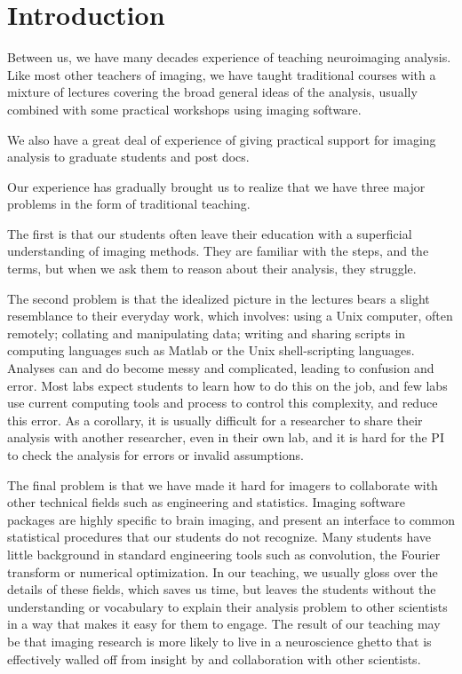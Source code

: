 \section{Introduction}

Between us, we have many decades experience of teaching neuroimaging analysis.
Like most other teachers of imaging, we have taught traditional courses with a
mixture of lectures covering the broad general ideas of the analysis, usually
combined with some practical workshops using imaging software.

We also have a great deal of experience of giving practical support for
imaging analysis to graduate students and post docs.

Our experience has gradually brought us to realize that we have three major
problems in the form of traditional teaching.

The first is that our students often leave their education with a superficial
understanding of imaging methods.  They are familiar with the steps, and the
terms, but when we ask them to reason about their analysis, they struggle.

The second problem is that the idealized picture in the lectures bears a
slight resemblance to their everyday work, which involves: using a Unix
computer, often remotely; collating and manipulating data; writing and sharing
scripts in computing languages such as Matlab or the Unix shell-scripting
languages.  Analyses can and do become messy and complicated, leading to
confusion and error.  Most labs expect students to learn how to do this on the
job, and few labs use current computing tools and process to control this
complexity, and reduce this error.  As a corollary, it is usually
difficult for a researcher to share their analysis with another
researcher, even in their own lab, and it is hard for the PI to check the
analysis for errors or invalid assumptions.

The final problem is that we have made it hard for imagers to collaborate with
other technical fields such as engineering and statistics.  Imaging software
packages are highly specific to brain imaging, and present an interface to
common statistical procedures that our students do not recognize.  Many
students have little background in standard engineering tools such as
convolution, the Fourier transform or numerical optimization.  In our
teaching, we usually gloss over the details of these fields, which saves us
time, but leaves the students without the understanding or vocabulary to
explain their analysis problem to other scientists in a way that makes it easy
for them to engage.  The result of our teaching may be that imaging research
is more likely to live in a neuroscience ghetto that is effectively walled off
from insight by and collaboration with other scientists.



